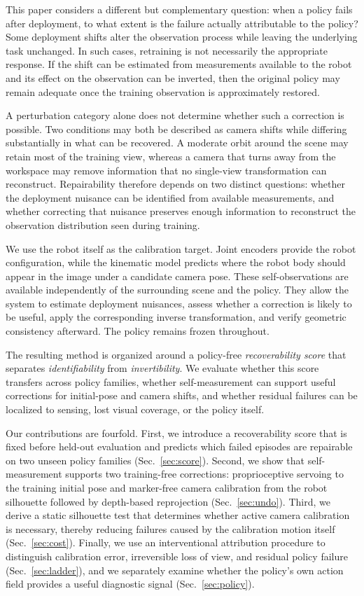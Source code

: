 \documentclass{article}
\begin{document}
This paper considers a different but complementary question: when a policy fails after deployment, to what extent is the
failure actually attributable to the policy? Some deployment shifts alter the observation process while leaving the
underlying task unchanged. In such cases, retraining is not necessarily the appropriate response. If the shift can be
estimated from measurements available to the robot and its effect on the observation can be inverted, then the original
policy may remain adequate once the training observation is approximately restored.

A perturbation category alone does not determine whether such a correction is possible. Two conditions may both be
described as camera shifts while differing substantially in what can be recovered. A moderate orbit around the scene may
retain most of the training view, whereas a camera that turns away from the workspace may remove information that no
single-view transformation can reconstruct. Repairability therefore depends on two distinct questions: whether the
deployment nuisance can be identified from available measurements, and whether correcting that nuisance preserves
enough information to reconstruct the observation distribution seen during training.

We use the robot itself as the calibration target. Joint encoders provide the robot configuration, while the kinematic
model predicts where the robot body should appear in the image under a candidate camera pose. These self-observations
are available independently of the surrounding scene and the policy. They allow the system to estimate deployment
nuisances, assess whether a correction is likely to be useful, apply the corresponding inverse transformation, and
verify geometric consistency afterward. The policy remains frozen throughout.

The resulting method is organized around a policy-free \emph{recoverability score} that separates
\emph{identifiability} from \emph{invertibility}. We evaluate whether this score transfers across policy families,
whether self-measurement can support useful corrections for initial-pose and camera shifts, and whether residual failures
can be localized to sensing, lost visual coverage, or the policy itself.

Our contributions are fourfold. First, we introduce a recoverability score that is fixed before held-out evaluation and
predicts which failed episodes are repairable on two unseen policy families (Sec.~\ref{sec:score}). Second, we show that
self-measurement supports two training-free corrections: proprioceptive servoing to the training initial pose and
marker-free camera calibration from the robot silhouette followed by depth-based reprojection
(Sec.~\ref{sec:undo}). Third, we derive a static silhouette test that determines whether active camera calibration is
necessary, thereby reducing failures caused by the calibration motion itself (Sec.~\ref{sec:cost}). Finally, we use an
interventional attribution procedure to distinguish calibration error, irreversible loss of view, and residual policy
failure (Sec.~\ref{sec:ladder}), and we separately examine whether the policy's own action field provides a useful
diagnostic signal (Sec.~\ref{sec:policy}).
\end{document}
